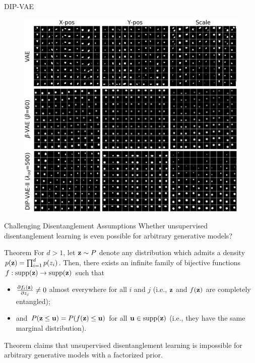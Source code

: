 \begin{frame}{DIP-VAE}
	\begin{figure}
		\centering
		\includegraphics[width=0.75\linewidth]{figs/dip-vae_1}
	\end{figure}

\end{frame}
\begin{frame}{Challenging Disentanglement Assumptions}
Whether unsupervised disentanglement learning is even possible for arbitrary generative models?

\begin{block}{Theorem}
	For $d > 1$, let $\mathbf{z} \sim P$ denote any distribution which admits a density $p(\mathbf{z}) = \prod^d_{i=1} p(z_i)$. Then, there exists an infinite family of bijective functions $f : \text{supp}(\mathbf{z}) \rightarrow \text{supp}(\mathbf{z})$ such that
	\begin{itemize}
		\item $\frac{\partial f_i(\mathbf{z})}{\partial z_j} \neq 0$ almost everywhere for all $i$ and $j$ (i.e., $\mathbf{z}$ and $f(\mathbf{z})$ are completely entangled);
		\item and $P(\mathbf{z} \leq \mathbf{u}) = P(f(\mathbf{z}) \leq \mathbf{u})$ for all $\mathbf{u} \in \text{supp}(\mathbf{z})$ (i.e., they
		have the same marginal distribution).
	\end{itemize}  
\end{block}

Theorem claims that unsupervised disentanglement learning is impossible for arbitrary generative models with a factorized prior.

\end{frame}
